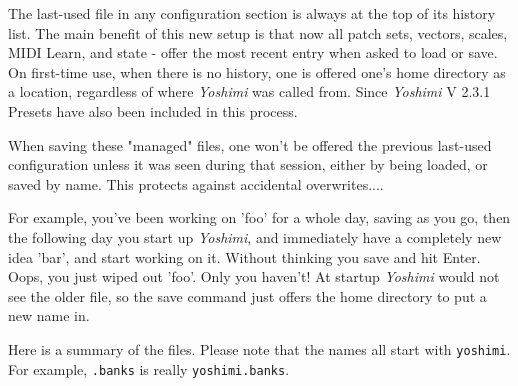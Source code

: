    The last-used file in any configuration section is always at the top of its
   history list.  The main benefit of this new setup is that now all patch
   sets, vectors, scales, MIDI Learn, and state - offer the most recent entry
   when asked to load or save. On first-time use, when there is no history, one
   is offered one's home directory as a location, regardless of where
   \textsl{Yoshimi} was called from.  Since \textsl{Yoshimi} V 2.3.1 Presets
   have also been included in this process.

   When saving these "managed" files, one won't be offered the previous
   last-used configuration unless it was seen during that session, either by
   being loaded, or saved by name.  This protects against accidental
   overwrites....

   For example, you've been working on 'foo' for a whole day, saving as you go,
   then the following day you start up \textsl{Yoshimi}, and immediately have
   a completely new idea 'bar', and start working on it. Without thinking you
   save and hit Enter. Oops, you just wiped out 'foo'. Only you haven't!
   At startup \textsl{Yoshimi} would not see the older file,
   so the save command just offers the home directory to put a new name in.

   Here is a summary of the files.  Please note that the names all start with
   \texttt{yoshimi}.  For example, \texttt{.banks} is really
   \texttt{yoshimi.banks}.

